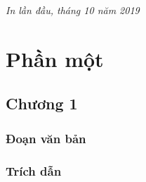 \documentclass[11pt,fleqn]{book} %
\begin{document}
\noindent \textit{In lần đầu, tháng 10 năm 2019} %




\pagestyle{empty} %

\tableofcontents %

\cleardoublepage %

\pagestyle{fancy} %


\part{Phần một}



\chapter{Chương 1}

\section{Đoạn văn bản}

\lipsum[1-7] %


\section{Trích dẫn}
\end{document}
